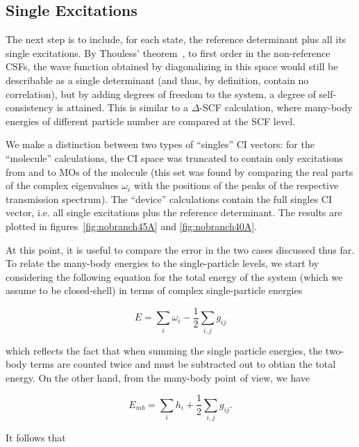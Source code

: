 \subsection{Single Excitations}
\label{subsec:singles}

The next step is to include, for each state, the reference determinant plus all
its single excitations. By Thouless' theorem~\cite{Thouless}, to first order in
the non-reference \acp{CSF}, the wave function obtained by diagonalizing in
this space would still be describable as a single determinant (and
thus, by definition, contain no correlation), but by adding degrees of freedom
to the system, a degree of self-consistency is attained. This is similar to a
$\Delta$-SCF calculation, where many-body energies of different particle number
are compared at the SCF level.

We make a distinction between two types of ``singles'' \ac{CI} vectors: for the
``molecule'' calculations, the \ac{CI} space was truncated to contain only
excitations from and to MOs of the molecule (this set was found by comparing
the real parts of the complex eigenvalues $\omega_i$ with the positions of the
peaks of the respective transmission spectrum). The ``device'' calculations
contain the full singles \ac{CI} vector, i.e. all single excitations plus the
reference determinant. The results are plotted in figures~\ref{fig:nobranch45A}
and \ref{fig:nobranch40A}.

At this point, it is useful to compare the error in the two cases discussed
thus far. To relate the many-body energies to the single-particle levels, we
start by considering the following equation for the total energy of the system
(which we assume to be closed-shell) in terms of complex single-particle
energies

\begin{equation}
	E = \sum_i \omega_i - \frac{1}{2} \sum_{i,j} g_{ij}
	\label{eq:sptotalenergy}
\end{equation}

which reflects the fact that when summing the single particle energies, the
two-body terms are counted twice and must be subtracted out to obtian the total
energy. On the other hand, from the many-body point of view, we have

\begin{equation}
	E_{mb} = \sum_i h_i + \frac{1}{2} \sum_{i,j} g_{ij}.
	\label{eq:mbtotalenergy}
\end{equation}

It follows that

